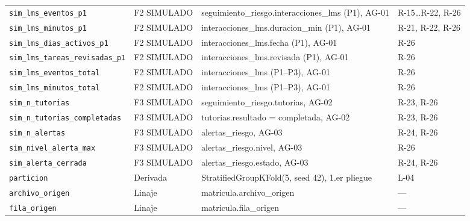 \begin{tabular}{p{3.9cm}p{2.0cm}p{6.8cm}p{2.2cm}}
\texttt{sim\_lms\_eventos\_p1} & F2 SIMULADO & seguimiento\_riesgo.interacciones\_lms (P1), AG-01 & R-15…R-22, R-26 \\
\texttt{sim\_lms\_minutos\_p1} & F2 SIMULADO & interacciones\_lms.duracion\_min (P1), AG-01 & R-21, R-22, R-26 \\
\texttt{sim\_lms\_dias\_activos\_p1} & F2 SIMULADO & interacciones\_lms.fecha (P1), AG-01 & R-26 \\
\texttt{sim\_lms\_tareas\_revisadas\_p1} & F2 SIMULADO & interacciones\_lms.revisada (P1), AG-01 & R-26 \\
\texttt{sim\_lms\_eventos\_total} & F2 SIMULADO & interacciones\_lms (P1–P3), AG-01 & R-26 \\
\texttt{sim\_lms\_minutos\_total} & F2 SIMULADO & interacciones\_lms (P1–P3), AG-01 & R-26 \\
\texttt{sim\_n\_tutorias} & F3 SIMULADO & seguimiento\_riesgo.tutorias, AG-02 & R-23, R-26 \\
\texttt{sim\_n\_tutorias\_completadas} & F3 SIMULADO & tutorias.resultado = completada, AG-02 & R-23, R-26 \\
\texttt{sim\_n\_alertas} & F3 SIMULADO & alertas\_riesgo, AG-03 & R-24, R-26 \\
\texttt{sim\_nivel\_alerta\_max} & F3 SIMULADO & alertas\_riesgo.nivel, AG-03 & R-26 \\
\texttt{sim\_alerta\_cerrada} & F3 SIMULADO & alertas\_riesgo.estado, AG-03 & R-24, R-26 \\
\texttt{particion} & Derivada & StratifiedGroupKFold(5, seed 42), 1.er pliegue & L-04 \\
\texttt{archivo\_origen} & Linaje & matricula.archivo\_origen & — \\
\texttt{fila\_origen} & Linaje & matricula.fila\_origen & — \\
\bottomrule
\end{tabular}
